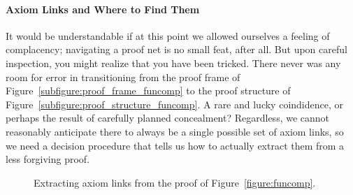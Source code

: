 \paragraph{Axiom Links and Where to Find Them}
It would be understandable if at this point we allowed ourselves a feeling of complacency; navigating a proof net is no small feat, after all.
But upon careful inspection, you might realize that you have been tricked.
There never was any room for error in transitioning from the proof frame of Figure~\ref{subfigure:proof_frame_funcomp} to the proof structure of Figure~\ref{subfigure:proof_structure_funcomp}. 
A rare and lucky coindidence, or perhaps the result of carefully planned concealment?
Regardless, we cannot reasonably anticipate there to always be a single possible set of axiom links, so we need a decision procedure that tells us how to actually extract them from a less forgiving proof.

\begin{figure}
	\centering
	\caption{Extracting axiom links from the proof of Figure~\ref{figure:funcomp}.}
	\label{figure:funcomp_annotated}
\end{figure}

